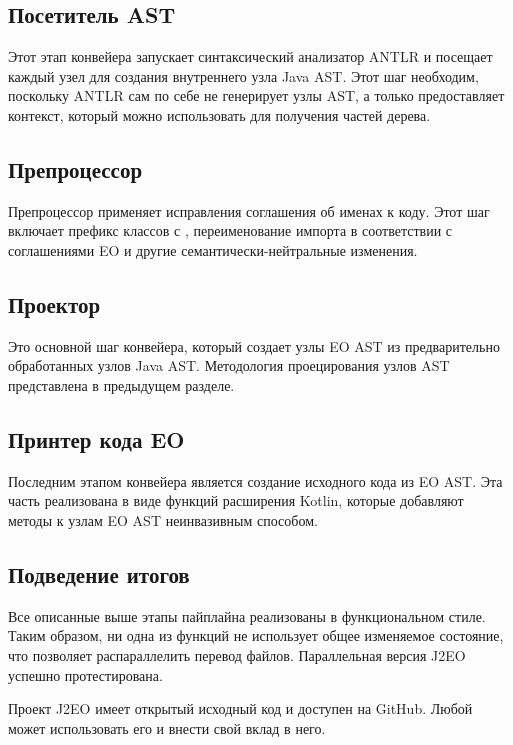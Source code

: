 \documentclass[oneside,final,14pt,a4paper]{extreport}
\theoremstyle{definition}
\theoremstyle{remark}
\theoremstyle{remark}
\begin{document}
\subsection{Посетитель AST}
Этот этап конвейера запускает синтаксический анализатор ANTLR и посещает каждый узел для создания внутреннего узла Java AST. Этот шаг необходим, поскольку ANTLR сам по себе не генерирует узлы AST, а только предоставляет контекст, который можно использовать для получения частей дерева.

\subsection{Препроцессор}

Препроцессор применяет исправления соглашения об именах к коду. Этот шаг включает префикс классов с , переименование импорта в соответствии с соглашениями EO и другие семантически-нейтральные изменения.

\subsection{Проектор}

Это основной шаг конвейера, который создает узлы EO AST из предварительно обработанных узлов Java AST. Методология проецирования узлов AST представлена в предыдущем разделе.

\subsection{Принтер кода EO}

Последним этапом конвейера является создание исходного кода из EO AST. Эта часть реализована в виде функций расширения Kotlin, которые добавляют методы к узлам EO AST неинвазивным способом.

\subsection{Подведение итогов}

Все описанные выше этапы пайплайна реализованы в функциональном стиле. Таким образом, ни одна из функций не использует общее изменяемое состояние, что позволяет распараллелить перевод файлов. Параллельная версия J2EO успешно протестирована.

Проект J2EO имеет открытый исходный код и доступен на GitHub. Любой может использовать его и внести свой вклад в него.
\end{document}

